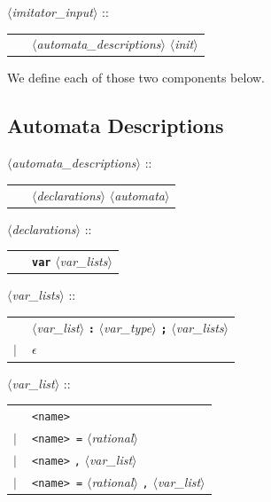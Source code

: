 \documentclass[a4paper,11pt]{report}
\newcommand{\emptystring}{$\epsilon$}
\newcommand{\nt}[1]{$\langle$\emph{#1}$\rangle$}
\newcommand{\regleGrammaire}[1]{\bigskip \noindent \nt{#1} :: \\}
\newcommand{\code}[1]{\textbf{\texttt{#1}}}
\newcommand{\styleIMI}[1]{\textcolor{imicolor}{\texttt{#1}}}
\begin{document}
\regleGrammaire{imitator\_input}
\begin{tabular}{l l}
	\  & \nt{automata\_descriptions} \nt{init} \\
\end{tabular}

\medskip


We define each of those two components below.

\subsection{Automata Descriptions}

\regleGrammaire{automata\_descriptions}
\begin{tabular}{l l}
	\  & \nt{declarations} \nt{automata} \\
\end{tabular}

\regleGrammaire{declarations}
\begin{tabular}{l l}
	\  & \code{var} \nt{var\_lists} \\
\end{tabular}

\regleGrammaire{var\_lists}
\begin{tabular}{l l}
	\  & \nt{var\_list} \code{:} \nt{var\_type} \code{;} \nt{var\_lists} \\
	$|$ & \emptystring
\end{tabular}

\regleGrammaire{var\_list}
\begin{tabular}{l l}
	\  & \styleIMI{<name>} \\
	$|$ & \styleIMI{<name> =} \nt{rational} \\
	$|$ & \styleIMI{<name>} \styleIMI{,} \nt{var\_list}\\
	$|$ & \styleIMI{<name> =} \nt{rational} \styleIMI{,} \nt{var\_list}\\
\end{tabular}
\end{document}
